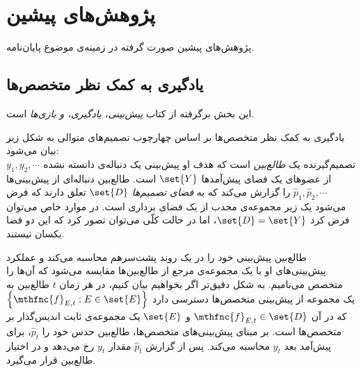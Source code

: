 \documentclass[a4paper,11px]{article}
\begin{document}
\section{
پژوهش‌های پیشین
}

پژوهش‌های پیشین صورت گرفته در زمینه‌ی موضوع پایان‌نامه.




\subsection{
یادگیری به کمک نظر متخصص‌ها
}
این بخش برگرفته از کتاب 
\textit{
پیش‌بینی، یادگیری، و بازی‌ها
}\cite{predictionlearninggames2006}
است.


یادگیری به کمک نظر متخصص‌ها
بر اساس چهارچوب تصمیم‌های متوالی
به شکل زیر بیان می‌شود:\\
تصمیم‌گیرنده یک 
\textit{
طالع‌بین
} 
است که هدف او پیش‌بینی یک دنباله‌ی دانسته نشده 
$y_1, y_2, \cdots$ 
از عضوهای یک فضای پیش‌آمدها 
$\set{Y}$
است. طالع‌بین دنباله‌ای از پیش‌بینی‌ها
$\hat{p}_1, \hat{p}_2, \cdots$ 
را گزارش می‌کند که به 
\textit{
فضای تصمیم‌ها
} 
$\set{D}$ 
تعلق دارند که فرض می‌شود یک زیر مجموعه‌ی محدب از یک فضای برداری است. در موارد خاص می‌توان فرض کرد 
$\set{D} = \set{Y}$، 
اما در حالت کلّی می‌توان تصور کرد که این دو فضا یکسان نیستند.


طالع‌بین پیش‌بینی خود را در یک روند پشت‌سرهم محاسبه می‌کند و عملکرد پیش‌بینی‌های او با یک مجموعه‌ی مرجع از طالع‌بین‌ها مقایسه می‌شود که آن‌ها را متخصص می‌نامیم. به شکل دقیق‌تر اگر بخواهیم بیان کنیم، در هر زمان 
$t$ 
طالع‌بین به یک مجموعه از پیش‌بینی متخصص‌ها دسترسی دارد 
$\left\lbrace \mthfnc{f}_{E,t} : E \in \set{E} \right\rbrace$ 
که در آن 
$\mthfnc{f}_{E,t} \in \set{D}$ 
و 
$\set{E}$ 
یک مجموعه‌ی ثابت اندیس‌گذار بر متخصص‌ها است. بر مبنای پیش‌بینی‌های متخصص‌ها، طالع‌بین حدس خود را 
$\hat{p}_t$، 
برای پیش‌آمد بعد 
$y_t$ 
محاسبه می‌کند. پس از گزارش 
$\hat{p}_t$ 
مقدار 
$y_t$ 
رخ می‌دهد و در اختیار طالع‌بین قرار می‌گیرد.
\end{document}
